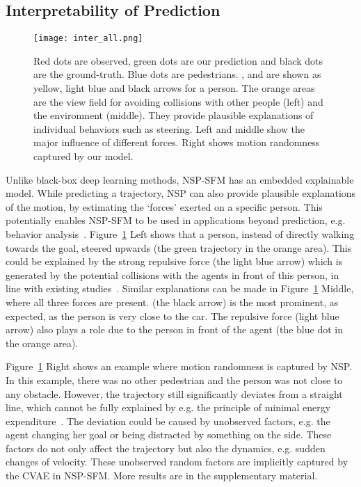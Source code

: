 \documentclass[runningheads]{llncs}
\newcommand{\Figref}[1]{Figure~\ref{fig:#1}}
\begin{document}
\subsection{Interpretability of Prediction}
\begin{figure}[tb]
\centering
\texttt{[image: inter\_all.png]}
\caption{Red dots are observed, green dots are our prediction and black dots are the ground-truth. Blue dots are pedestrians. ,  and  are shown as yellow, light blue and black arrows for a person. The orange areas are the view field for avoiding collisions with other people (left) and the environment (middle). They provide plausible explanations of individual behaviors such as steering. Left and middle show the major influence of different forces. Right shows motion randomness captured by our model.}
\label{fig:interpretability}
\end{figure}

Unlike black-box deep learning methods, NSP-SFM has an embedded explainable model. While predicting a trajectory, NSP can also provide plausible explanations of the motion, by estimating the `forces' exerted on a specific person. This potentially enables NSP-SFM to be used in applications beyond prediction, e.g. behavior analysis~\cite{zeng2014application}. \Figref{interpretability} Left shows that a person, instead of directly walking towards the goal, steered upwards (the green trajectory in the orange area). This could be explained by the strong repulsive force (the light blue arrow) which is generated by the potential collisions with the agents in front of this person, in line with existing studies~\cite{narang2015generating}. Similar explanations can be made in \Figref{interpretability} Middle, where all three forces are present.  (the black arrow) is the most prominent, as expected, as the person is very close to the car. The repulsive force (light blue arrow) also plays a role due to the person in front of the agent (the blue dot in the orange area). 

\Figref{interpretability} Right shows an example where motion randomness is captured by NSP. In this example, there was no other pedestrian and the person was not close to any obstacle. However, the trajectory still significantly deviates from a straight line, which cannot be fully explained by e.g. the principle of minimal energy expenditure~\cite{virtanen2013energy}. The deviation could be caused by unobserved factors, e.g. the agent changing her goal or being distracted by something on the side. These factors do not only affect the trajectory but also the dynamics, e.g. sudden changes of velocity. These unobserved random factors are implicitly captured by the CVAE in NSP-SFM. More results are in the supplementary material.
\end{document}
